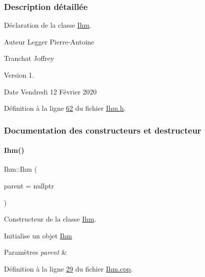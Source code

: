 \subsubsection{Description détaillée}
Déclaration de la classe \hyperlink{class_ihm}{Ihm}. 

\begin{DoxyAuthor}{Auteur}
Legger Pierre-\/\+Antoine 

Tranchat Joffrey
\end{DoxyAuthor}
\begin{DoxyVersion}{Version}
1.
\end{DoxyVersion}
\begin{DoxyDate}{Date}
Vendredi 12 Février 2020 
\end{DoxyDate}


Définition à la ligne \hyperlink{_ihm_8h_source_l00062}{62} du fichier \hyperlink{_ihm_8h_source}{Ihm.\+h}.



\subsubsection{Documentation des constructeurs et destructeur}
\mbox{\label{class_ihm_a50a7a15775452923868348bdbe4fa51e}} 
\paragraph{\texorpdfstring{Ihm()}{Ihm()}}
{\footnotesize\ttfamily Ihm\+::\+Ihm (\begin{DoxyParamCaption}\item[{Q\+Widget $\ast$}]{parent = {\ttfamily nullptr} }\end{DoxyParamCaption})\hspace{0.3cm}{\ttfamily [explicit]}}



Constructeur de la classe \hyperlink{class_ihm}{Ihm}. 

Initialise un objet \hyperlink{class_ihm}{Ihm} 
\begin{DoxyParams}{Paramètres}
{\em parent} & \\
\hline
\end{DoxyParams}


Définition à la ligne \hyperlink{_ihm_8cpp_source_l00029}{29} du fichier \hyperlink{_ihm_8cpp_source}{Ihm.\+cpp}.



